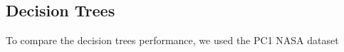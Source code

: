 \subsection{Decision Trees}
To compare the decision trees performance, we used the PC1 NASA dataset

